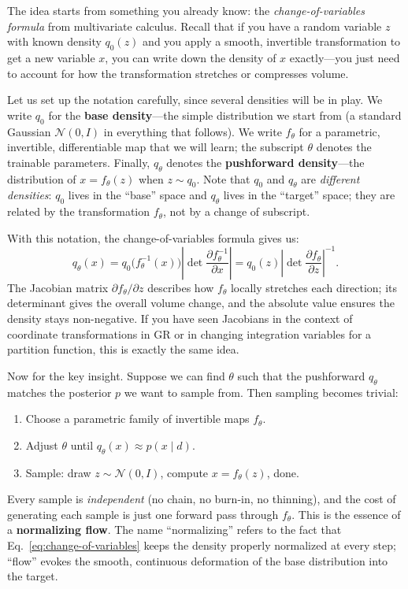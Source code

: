 \documentclass[11pt,letterpaper]{article}
\begin{document}
The idea starts from something you already know: the
\emph{change-of-variables formula} from multivariate calculus.
Recall that if you have a random variable $z$ with known density
$q_0(z)$ and you apply a smooth, invertible transformation to get a new
variable $x$, you can write down the density of $x$ exactly---you just
need to account for how the transformation stretches or compresses
volume.

Let us set up the notation carefully, since several densities will be
in play.
We write $q_0$ for the \textbf{base density}---the simple distribution
we start from (a standard Gaussian $\mathcal{N}(0,I)$ in everything
that follows).
We write $f_\theta$ for a parametric, invertible, differentiable map
that we will learn; the subscript $\theta$ denotes the trainable
parameters.
Finally, $q_\theta$ denotes the \textbf{pushforward density}---the
distribution of $x = f_\theta(z)$ when $z \sim q_0$.
Note that $q_0$ and $q_\theta$ are \emph{different densities}: $q_0$
lives in the ``base'' space and $q_\theta$ lives in the ``target''
space; they are related by the transformation $f_\theta$, not by
a change of subscript.

With this notation, the change-of-variables formula gives us:
\begin{equation}
  q_\theta(x) = q_0\!\bigl(f_\theta^{-1}(x)\bigr)
  \left|\det \frac{\partial f_\theta^{-1}}{\partial x}\right|
  = q_0(z) \left|\det \frac{\partial f_\theta}{\partial z}\right|^{-1}.
  \label{eq:change-of-variables}
\end{equation}
The Jacobian matrix $\partial f_\theta / \partial z$ describes how
$f_\theta$ locally stretches each direction;
its determinant gives the overall volume change, and the absolute value
ensures the density stays non-negative.
If you have seen Jacobians in the context of coordinate transformations
in GR or in changing integration variables for a partition function,
this is exactly the same idea.

Now for the key insight.
Suppose we can find $\theta$ such that the pushforward $q_\theta$
matches the posterior $p$ we want to sample from.
Then sampling becomes trivial:
\begin{enumerate}[label=\arabic*.]
  \item Choose a parametric family of invertible maps $f_\theta$.
  \item Adjust $\theta$ until $q_\theta(x) \approx p(x \mid d)$.
  \item Sample: draw $z \sim \mathcal{N}(0, I)$,
        compute $x = f_\theta(z)$, done.
\end{enumerate}
Every sample is \emph{independent} (no chain, no burn-in, no thinning),
and the cost of generating each sample is just one forward pass through
$f_\theta$.
This is the essence of a \textbf{normalizing flow}.
The name ``normalizing'' refers to the fact that
Eq.~\eqref{eq:change-of-variables} keeps the density properly
normalized at every step; ``flow'' evokes the smooth, continuous
deformation of the base distribution into the target.
\end{document}

